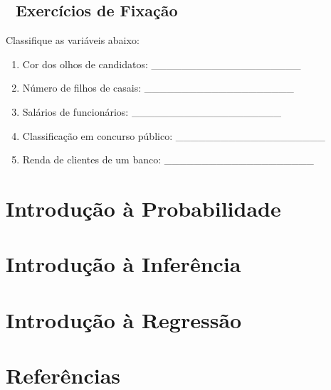\documentclass[
  letterpaper,
  DIV=11,
  numbers=noendperiod]{scrreprt}
\providecommand{\tightlist}{%
  \setlength{\itemsep}{0pt}\setlength{\parskip}{0pt}}\usepackage{longtable,booktabs,array}
\newlength{\cslhangindent}
\newenvironment{CSLReferences}[2] %
 {\begin{list}{}{%
  \setlength{\itemindent}{0pt}
  \setlength{\leftmargin}{0pt}
  \setlength{\parsep}{0pt}
  \ifodd #1
   \setlength{\leftmargin}{\cslhangindent}
   \setlength{\itemindent}{-1\cslhangindent}
  \fi
  \setlength{\itemsep}{#2\baselineskip}}}
 {\end{list}}
\begin{document}
\section{📝 Exercícios de Fixação}\label{exercuxedcios-de-fixauxe7uxe3o}

Classifique as variáveis abaixo:

\begin{enumerate}
\def\labelenumi{\arabic{enumi}.}
\tightlist
\item
  Cor dos olhos de candidatos: \_\_\_\_\_\_\_\_\_\_\_\_\_\_\_\_\_\_\_\_
\item
  Número de filhos de casais: \_\_\_\_\_\_\_\_\_\_\_\_\_\_\_\_\_\_\_\_
\item
  Salários de funcionários: \_\_\_\_\_\_\_\_\_\_\_\_\_\_\_\_\_\_\_\_
\item
  Classificação em concurso público:
  \_\_\_\_\_\_\_\_\_\_\_\_\_\_\_\_\_\_\_\_
\item
  Renda de clientes de um banco:
  \_\_\_\_\_\_\_\_\_\_\_\_\_\_\_\_\_\_\_\_
\end{enumerate}


\chapter{Introdução à
Probabilidade}\label{introduuxe7uxe3o-uxe0-probabilidade}


\chapter{Introdução à
Inferência}\label{introduuxe7uxe3o-uxe0-inferuxeancia}


\chapter{Introdução à
Regressão}\label{introduuxe7uxe3o-uxe0-regressuxe3o}


\chapter*{Referências}\label{referuxeancias}


\label{refs}
\begin{CSLReferences}{0}{1}
\end{CSLReferences}
\end{document}
